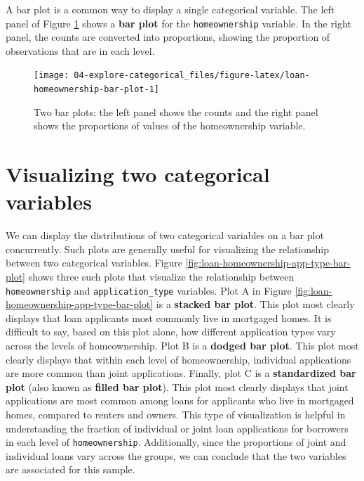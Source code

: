 \documentclass[
  10pt,
  openany]{book}
\begin{document}
A bar plot is a common way to display a single categorical variable.
The left panel of Figure \ref{fig:loan-homeownership-bar-plot} shows a \textbf{bar plot} for the \texttt{homeownership} variable.
In the right panel, the counts are converted into proportions, showing the proportion of observations that are in each level.

\begin{figure}[h]

{\centering \texttt{[image: 04-explore-categorical\_files/figure-latex/loan-homeownership-bar-plot-1]} 

}

\caption{Two bar plots: the left panel shows the counts and the right panel shows the proportions of values of the homeownership variable.}\label{fig:loan-homeownership-bar-plot}
\end{figure}

\hypertarget{visualizing-two-categorical-variables}{%
\section{Visualizing two categorical variables}\label{visualizing-two-categorical-variables}}

We can display the distributions of two categorical variables on a bar plot concurrently.
Such plots are generally useful for visualizing the relationship between two categorical variables.
Figure \ref{fig:loan-homeownership-app-type-bar-plot} shows three such plots that visualize the relationship between \texttt{homeownership} and \texttt{application\_type} variables.
Plot A in Figure \ref{fig:loan-homeownership-app-type-bar-plot} is a \textbf{stacked bar plot}.
This plot most clearly displays that loan applicants most commonly live in mortgaged homes.
It is difficult to say, based on this plot alone, how different application types vary across the levels of homeownership.
Plot B is a \textbf{dodged bar plot}.
This plot most clearly displays that within each level of homeownership, individual applications are more common than joint applications.
Finally, plot C is a \textbf{standardized bar plot} (also known as \textbf{filled bar plot}).
This plot most clearly displays that joint applications are most common among loans for applicants who live in mortgaged homes, compared to renters and owners.
This type of visualization is helpful in understanding the fraction of individual or joint loan applications for borrowers in each level of \texttt{homeownership}.
Additionally, since the proportions of joint and individual loans vary across the groups, we can conclude that the two variables are associated for this sample.
\end{document}
